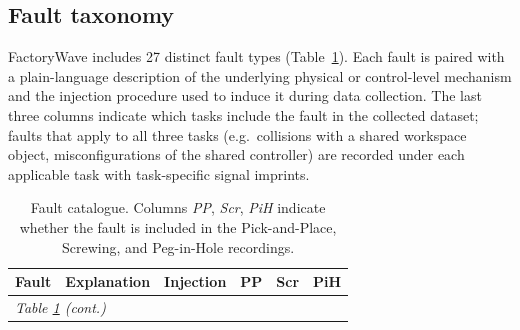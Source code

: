 \documentclass{article}
\begin{document}
\subsection{Fault taxonomy}

FactoryWave includes 27 distinct fault types (Table~\ref{tab:faults}). Each fault is paired with a plain-language description of the underlying physical or control-level mechanism and the injection procedure used to induce it during data collection. The last three columns indicate which tasks include the fault in the collected dataset; faults that apply to all three tasks (e.g.\ collisions with a shared workspace object, misconfigurations of the shared controller) are recorded under each applicable task with task-specific signal imprints.



    {\renewcommand{\arraystretch}{1.35}
        \begin{longtable}{@{}p{3.1cm}p{4.2cm}p{4.6cm}ccc@{}}
            \caption{Fault catalogue. Columns \textit{PP}, \textit{Scr}, \textit{PiH} indicate whether the fault is included in the Pick-and-Place, Screwing, and Peg-in-Hole recordings.}
            \label{tab:faults}                                                                                                                                                                                                                                                                                                                                                                                                                                                   \\
            \toprule
            Fault                             & Explanation                                                                                                                                                                                                     & Injection                                                                                                                                                               & PP         & Scr        & PiH        \\
            \midrule
            \endfirsthead
            \multicolumn{6}{l}{\small\textit{Table \ref{tab:faults} (cont.)}}                                                                                                                                                                                                                                                                                                                                                                                                    \\

\end{longtable}}
\end{document}
